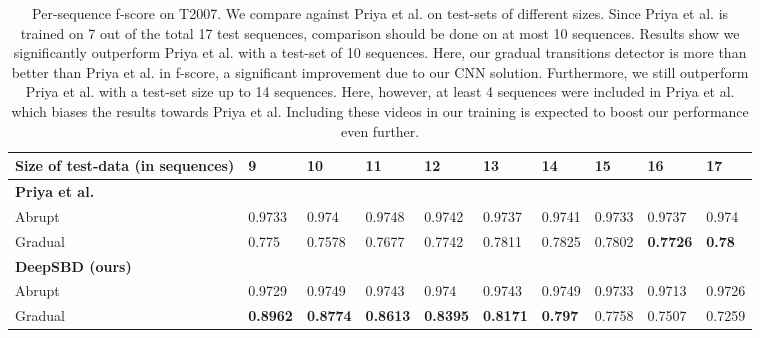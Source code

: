\documentclass[journal]{IEEEtran}
\begin{document}
\begin{table*}
\small
\centering
\begin{tabular}{|l | l | l | l | l | l | l | l | l | l |}
     \hline      
			Size of test-data (in sequences)	& 9       &  10      &  11     & 12      & 13    & 14     & 15   & 16  & 17  \\
     \hline
			 \textbf{Priya et al. \cite{Priya14}}       &         &         &         &         &       &        &     &   &   \\
					Abrupt                                  &  0.9733 &  0.974 &  0.9748  &  0.9742 & 0.9737 & 0.9741  & 0.9733 & 0.9737 & 0.974\\
			    Gradual                                 &  0.775  &  0.7578  &  0.7677 &  0.7742 & 0.7811 & 0.7825 & 0.7802 & \textbf{0.7726} & \textbf{0.78} \\ 
			\hline
			\textbf{DeepSBD (ours)}                            &         &         &         &         &       &        &     &   &   \\
				 Abrupt                                   &  0.9729 &  0.9749  &  0.9743 &  0.974 & 0.9743 & 0.9749  & 0.9733   & 0.9713 & 0.9726\\ 
				 Gradual                                  &  \textbf{0.8962}  &  \textbf{0.8774} &  \textbf{0.8613} &  \textbf{0.8395}  & \textbf{0.8171} & \textbf{0.797}   & 0.7758 &  0.7507 & 0.7259\\ 
			\hline
    \end{tabular}\vspace{3pt}
\caption{Per-sequence f-score on T2007. We compare against Priya et al. \cite{Priya14} on test-sets of different sizes. Since Priya et al. \cite{Priya14} is trained on 7 out of the total 17 test sequences, comparison should be done on at most 10 sequences. Results show we significantly outperform Priya et al. with a test-set of 10 sequences. Here, our gradual transitions detector is more than  better than Priya et al. in f-score, a significant improvement due to our CNN solution. Furthermore, we still outperform Priya et al. with a test-set size up to 14 sequences. Here, however, at least 4 sequences were included in Priya et al. which biases the results towards Priya et al. Including these videos in our training is expected to boost our performance even further.}
\label{tab:PriyaSummary}
\end{table*}
\end{document}
